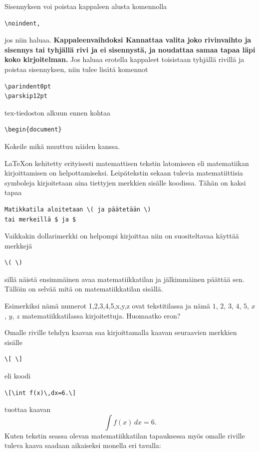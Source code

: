 \documentclass[a4paper,12 pt]{article}
\theoremstyle{plain}
\theoremstyle{definition}
\theoremstyle{remark}
\numberwithin{equation}{section}
\numberwithin{figure}{section}
\begin{document}
\indent Sisennyksen voi poistaa kappaleen alusta komennolla

\begin{verbatim}
\noindent,
\end{verbatim}

\noindent jos niin haluaa. \textbf{Kappaleenvaihdoksi Kannattaa valita joko rivinvaihto ja sisennys tai tyhjällä rivi ja ei sisennystä, ja noudattaa samaa tapaa läpi koko kirjoitelman.} Jos haluaa erotella kappaleet toisistaan tyhjällä rivillä ja poistaa sisennyksen, niin tulee lisätä komennot

\begin{verbatim}
\parindent0pt
\parskip12pt
\end{verbatim}
tex-tiedoston alkuun ennen kohtaa

\begin{verbatim}
\begin{document}
\end{verbatim}
Kokeile mikä muuttuu näiden kanssa.

\LaTeX on kehitetty erityisesti matemattisen tekstin latomiseen eli matematiikan kirjoittamisen on helpottamiseksi. Leipätekstin sekaan tulevia matematiittisia symboleja kirjoitetaan aina tiettyjen merkkien sisälle koodissa. Tähän on kaksi tapaa

\begin{verbatim}
Matikkatila aloitetaan \( ja päätetään \)
tai merkeillä $ ja $ 
\end{verbatim}
Vaikkakin dollarimerkki on helpompi kirjoittaa niin on suositeltavaa käyttää merkkejä

\begin{verbatim}
\( \)    
\end{verbatim}
sillä näistä ensimmäinen avaa matematiikkatilan ja jälkimmäinen päättää sen. Tällöin on selvää mitä on matematiikkatilan sisällä.

Esimerkiksi nämä numerot  1,2,3,4,5,x,y,z ovat tekstitilassa ja nämä $1$, $2$, $3$, $4$, $5$, $x$, $y$, $z$ matematiikkatilassa kirjoitettuja. Huomaatko eron? 

Omalle riville tehdyn kaavan saa kirjoittamalla kaavan seuraavien merkkien sisälle

\begin{verbatim}
\[ \]    
\end{verbatim}
eli koodi

\begin{verbatim}
\[\int f(x)\,dx=6.\]    
\end{verbatim}
tuottaa kaavan
\[\int f(x)\,dx=6.\]    
Kuten tekstin seassa olevan matematiikkatilan tapauksessa myös omalle riville tuleva kaava saadaan aikaiseksi monella eri tavalla:
\end{document}
